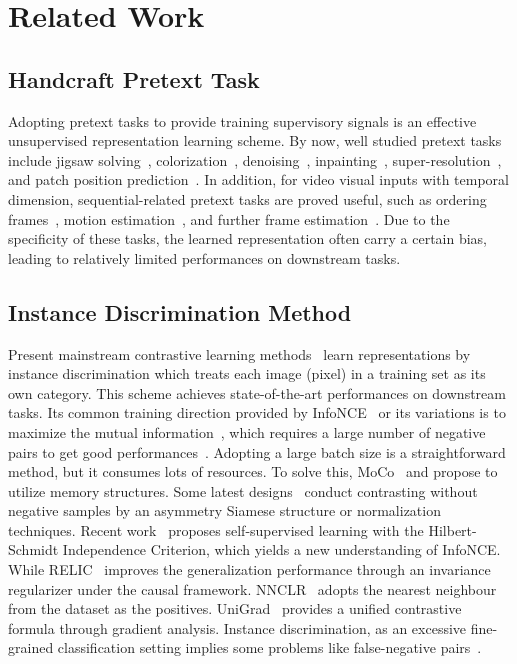 \documentclass[runningheads]{style/llncs}
\begin{document}
\section{Related Work}
\subsection{Handcraft Pretext Task} 
Adopting pretext tasks to provide training supervisory signals is an effective unsupervised representation learning scheme. By now, well studied pretext tasks include jigsaw solving~\cite{noroozi2016unsupervised,noroozi2018boosting}, colorization~\cite{vincent2008extracting,larsson2017colorization,zhang2016colorful}, denoising~\cite{vincent2008extracting}, inpainting~\cite{pathak2016context}, super-resolution~\cite{ledig2017photo}, and patch position prediction~\cite{doersch2015unsupervised,doersch2017multi}. In addition, for video visual inputs with temporal dimension, sequential-related pretext tasks are proved useful, such as ordering frames~\cite{fernando2017self,misra2016shuffle,wei2018learning}, motion estimation~\cite{agrawal2015learning,jayaraman2015learning,DBLP:journals/corr/abs-1712-01337,liu2018switchable}, and further frame estimation~\cite{lotter2016deep,mathieu2015deep,srivastava2015unsupervised,vondrick2016anticipating,vondrick2016generating}. Due to the specificity of these tasks, the learned representation often carry a certain bias, leading to relatively limited performances on downstream tasks.

\subsection{Instance Discrimination Method}
Present mainstream contrastive learning methods~\cite{moco,simclr,byol,swav,ressl,HSIC,Relic,care,unigrad,pang2021unsupervised} learn representations by instance discrimination which treats each image (pixel) in a training set as its own category. This scheme achieves state-of-the-art performances on downstream tasks. Its common training direction provided by InfoNCE~\cite{cpc,simclr,gutmann2010noise} or its variations is to maximize the mutual information~\cite{cpc,informax}, which requires a large number of negative pairs to get good performances~\cite{simclr}. Adopting a large batch size is a straightforward method, but it consumes lots of resources. To solve this, MoCo~\cite{moco} and \cite{wu2018unsupervised} propose to utilize memory structures. Some latest designs~\cite{byol,simsiam,dino} conduct contrasting without negative samples by an asymmetry Siamese structure or normalization techniques. Recent work~\cite{HSIC} proposes self-supervised learning with the Hilbert-Schmidt Independence Criterion, which yields a new understanding of InfoNCE. While RELIC~\cite{Relic} improves the generalization performance through an invariance regularizer under the causal framework. NNCLR~\cite{nnclr} adopts the nearest neighbour from the dataset as the positives. UniGrad~\cite{unigrad} provides a unified contrastive formula through gradient analysis. Instance discrimination, as an excessive fine-grained classification setting implies some problems like false-negative pairs~\cite{zhuang2019local}.
\end{document}
